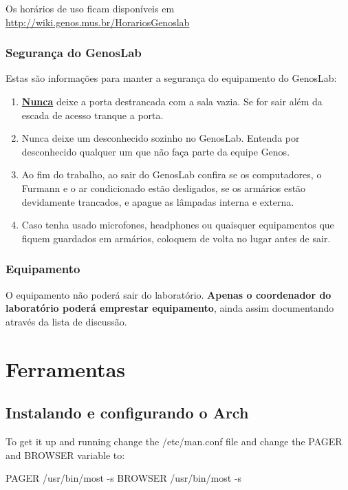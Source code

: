 \documentclass[12pt,brazil]{book}
\begin{document}
Os horários de uso ficam disponíveis em
\url{http://wiki.genos.mus.br/HorariosGenoslab}

\section{Segurança do GenosLab}
\label{sec:segur-do-genosl}

Estas são informações para manter a segurança do equipamento do
GenosLab:

\begin{enumerate}
\item \underline{\textbf{Nunca}} deixe a porta destrancada com a sala
  vazia. Se for sair além da escada de acesso tranque a porta.
\item Nunca deixe um desconhecido sozinho no GenosLab. Entenda por
  desconhecido qualquer um que não faça parte da equipe Genos.
\item Ao fim do trabalho, ao sair do GenosLab confira se os
  computadores, o Furmann e o ar condicionado estão desligados, se os
  armários estão devidamente trancados, e apague as lâmpadas interna e
  externa.
\item Caso tenha usado microfones, headphones ou quaisquer
  equipamentos que fiquem guardados em armários, coloquem de volta no
  lugar antes de sair.
\end{enumerate}

\section{Equipamento}
\label{sec:equipamento}

O equipamento não poderá sair do laboratório. \textbf{Apenas o
  coordenador do laboratório poderá emprestar equipamento}, ainda
assim documentando através da lista de discussão.

\part{Ferramentas}
\label{part:ferramentas}

\chapter{Instalando e configurando o Arch}
\label{cha:inst-e-conf}

To get it up and running change the /etc/man.conf file and change the PAGER and BROWSER variable to:

PAGER           /usr/bin/most -s
BROWSER         /usr/bin/most -s
\end{document}
